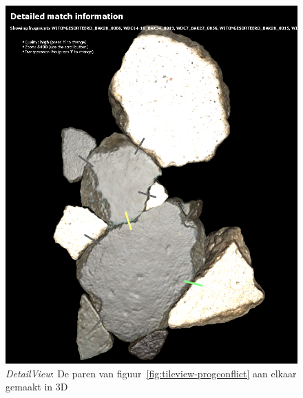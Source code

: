 \begin{figure}[ht]
	\begin{center}
		\includegraphics[width=1.0\columnwidth]{images/detailview-interesting-thin.png}
		\caption{\emph{DetailView}: De paren van figuur~\ref{fig:tileview-progconflict} aan elkaar gemaakt in 3D}
		\label{fig:detailfull}
	\end{center}
\end{figure}

\FloatBarrier

